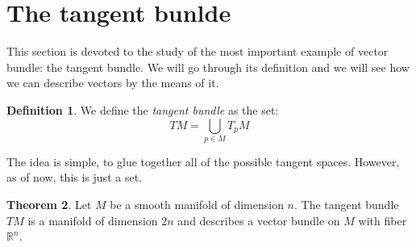 \documentclass[12pt,a4paper]{report}
\theoremstyle{definition}
\newtheorem{Def}{Definition}[chapter]
\theoremstyle{Theorem}
\newtheorem{Theo}[Def]{Theorem}
\theoremstyle{break}
\theoremstyle{definition}
\begin{document}
		\section{The tangent bunlde}
			This section is devoted to the study of the most important example of vector bundle: the tangent bundle. We will go through its definition and we will see how we can describe vectors by the means of it.
			\begin{Def}
				We define the\textit{ tangent bundle} as the set:
				$$TM=\bigcup_{p\in M}T_pM$$
			\end{Def}
			The idea is simple, to glue together all of the possible tangent spaces. However, as of now, this is just a set.
			\begin{Theo}
				Let $M$ be a smooth manifold of dimension $n$. The tangent bundle $TM$ is a manifold of dimension $2n$ and describes a vector bundle on $M$ with fiber $\mathbb{R}^n$. 
			\end{Theo}
\end{document}
